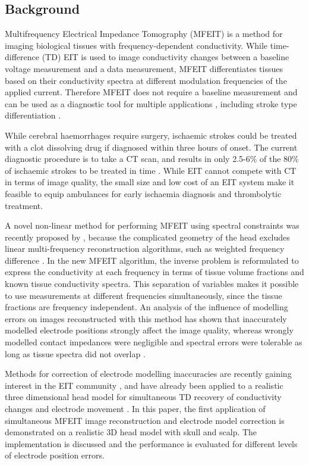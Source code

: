 \subsection{Background}
Multifrequency Electrical Impedance Tomography (MFEIT) is a method for imaging biological tissues with frequency-dependent conductivity. While time-difference (TD) EIT is used to image conductivity changes between a baseline voltage measurement and a data measurement, MFEIT differentiates tissues based on their conductivity spectra at different modulation frequencies of the applied current. Therefore MFEIT does not require a baseline measurement and can be used as a diagnostic tool for multiple applications \citep{Brown1995, Hampshire1995, Malich2003}, including stroke type differentiation \citep{Holder1992,Romsauerova2006, Packham2012}.

While cerebral haemorrhages require surgery, ischaemic strokes could be treated with a clot dissolving drug if diagnosed within three hours of onset. The current diagnostic procedure is to take a CT scan, and results in only 2.5-6\% of the 80\% of ischaemic strokes to be treated in time \citep{Power2004, Saver2013}. While EIT cannot compete with CT in terms of image quality, the small size and low cost of an EIT system make it feasible to equip ambulances for early ischaemia diagnosis and thrombolytic treatment.

A novel non-linear method for performing MFEIT using spectral constraints was recently proposed by \citet{Malone2013}, because the complicated geometry of the head excludes linear multi-frequency reconstruction algorithms, such as weighted frequency difference \citep{Jun2009}. In the new MFEIT algorithm, the inverse problem is reformulated to express the conductivity at each frequency in terms of tissue volume fractions and known tissue conductivity spectra. This separation of variables makes it possible to use measurements at different frequencies simultaneously, since the tissue fractions are frequency independent. An analysis of the influence of modelling errors on images reconstructed with this method has shown that inaccurately modelled electrode positions strongly affect the image quality, whereas wrongly modelled contact impedances were negligible and spectral errors were tolerable as long as tissue spectra did not overlap \citep{Malone2014}.

Methods for correction of electrode modelling inaccuracies are recently gaining interest in the EIT community \citep{Soleimani2006, Darde2012}, and have already been applied to a realistic three dimensional head model for simultaneous TD recovery of conductivity changes and electrode movement \citep{Jehl2015b}. In this paper, the first application of simultaneous MFEIT image reconstruction and electrode model correction is demonstrated on a realistic 3D head model with skull and scalp. The implementation is discussed and the performance is evaluated for different levels of electrode position errors.


